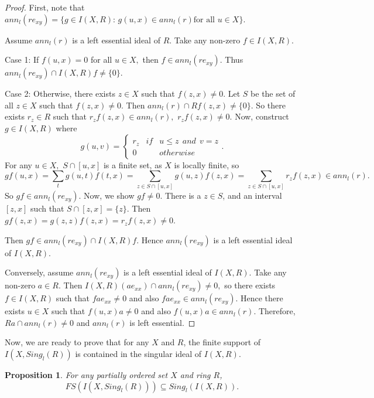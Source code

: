 \documentclass[12pt]{article}
\newtheorem{proposition}[theorem]{Proposition}
\begin{document}
\begin{proof}
First, note that $ann_l(re_{xy})=\{g\in I(X,R): \, g(u,x)\in ann_l(r) \text{
for all } u \in X\}$.

Assume $ann_l(r)$ is a left essential ideal of $R.$ Take any non-zero $f\in
I(X,R)$.

Case 1: If $f(u,x)=0$ for all $u\in X,$ then $f\in ann_l(re_{xy}).$ Thus $%
ann_l(re_{xy})\cap I(X,R)f\neq \{0\}.$

Case 2: Otherwise, there exists $z\in X$ such that $f(z,x)\neq 0.$ Let $S$
be the set of all $z \in X$ such that $f(z,x) \neq 0$. Then $ann_l(r)\cap
Rf(z,x)\neq \{0\}.$ So there exists $r_{z}\in R$ such that $r_{z}f(z,x)\in
ann_l(r),$ $r_{z}f(z,x)\neq 0.$ Now, construct $g\in I(X,R)$ where 
\begin{equation*}
g(u,v)=\left\{ 
\begin{array}{ccc}
r_{z} & if & u \leq z~~and~~v = z \\ 
0 &  & otherwise%
\end{array}
\right. .
\end{equation*}
For any $u\in X,$ $S \cap [u,x]$ is a finite set, as $X$ is locally finite,
so 
\begin{equation*}
gf(u,x)=\sum_{t}g(u,t)f(t,x)= \sum_{z \in S \cap [u,x]}g(u,z)f(z,x)= \sum_{z
\in S \cap [u,x]} r_{z}f(z,x) \in ann_l(r).
\end{equation*}
So $gf \in ann_l(re_{xy})$. Now, we show $gf \neq 0$. There is a $z \in S$,
and an interval $[z,x]$ such that $S \cap [z,x] = \{ z \}$. Then $%
gf(z,x)=g(z,z)f(z,x) = r_z f(z,x) \neq 0$.

Then $gf\in ann_l(re_{xy})\cap I(X,R)f.$ Hence $ann_l(re_{xy})$ is a left
essential ideal of $I(X,R).$

Conversely, assume $ann_l(re_{xy})$ is a left essential ideal of $I(X,R).$
Take any non-zero $a \in R.$ Then $I(X,R)(a e_{xx})\cap ann_l(re_{xy})\neq
0, $ so there exists $f\in I(X,R)$ such that $fa e_{xx}\neq 0$ and also $fa
e_{xx}\in ann_l(re_{xy}).$ Hence there exists $u\in X$ such that $%
f(u,x)a\neq 0$ and also $f(u,x)a\in ann_l(r).$ Therefore, $Ra \cap
ann_l(r)\neq 0$ and $ann_l(r)$ is left essential.
\end{proof}

\bigskip

Now, we are ready to prove that for any $X$ and $R$, the finite
support of $I(X,Sing_l(R))$ is contained in the singular ideal of ${I(X,R)}$.

\begin{proposition}
\label{finitesupport} For any partially ordered set $X$ and ring $R$, 
$$ FS(I(X,Sing_l(R))) \subseteq Sing_l({I(X,R)}).$$
\end{proposition}
\end{document}
